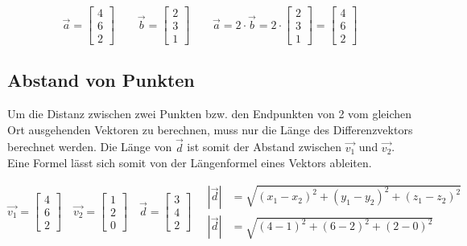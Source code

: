 \begin{equation*}
    \vec{a} =
    \begin{bmatrix}
        4 \\
        6 \\
        2
    \end{bmatrix}
    \qquad
    \vec{b} =
    \begin{bmatrix}
        2 \\
        3 \\
        1
    \end{bmatrix}
    \qquad
    \vec{a} =
    2 \cdot \vec{b} =
    2 \cdot
    \begin{bmatrix}
        2 \\
        3 \\
        1
    \end{bmatrix}
    =
    \begin{bmatrix}
        4 \\
        6 \\
        2
    \end{bmatrix}
\end{equation*}

\subsection{Abstand von Punkten}

Um die Distanz zwischen zwei Punkten bzw. den Endpunkten von 2 vom gleichen Ort
ausgehenden Vektoren zu berechnen, muss nur die Länge des Differenzvektors berechnet
werden. Die Länge von $\vec{d}$ ist somit der Abstand zwischen
$\vec{v_1}$ und $\vec{v_2}$.
Eine Formel lässt sich somit von der Längenformel eines Vektors ableiten.

\begin{equation*}
    \vec{v_1} =
    \begin{bmatrix}
        4 \\
        6 \\
        2
    \end{bmatrix}
    \quad
    \vec{v_2} =
    \begin{bmatrix}
        1 \\
        2 \\
        0
    \end{bmatrix}
    \quad
    \vec{d} =
    \begin{bmatrix}
        3 \\
        4 \\
        2
    \end{bmatrix}
    \quad
    \begin{aligned}
        | \vec{d} | & = \sqrt{(x_1 - x_2)^2 + (y_1 - y_2)^2 + (z_1 - z_2)^2} \\
        | \vec{d} | & = \sqrt{(4 - 1)^2 + (6 - 2)^2 + (2 - 0)^2}
    \end{aligned}
\end{equation*}


